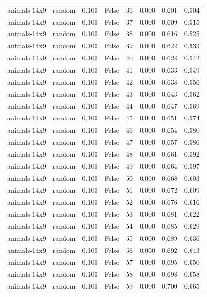 \begin{tabular}{llrrrrrr}
animals-14x9 & random & 0.100 & False & 36 & 0.000 & 0.601 & 0.504 \\
animals-14x9 & random & 0.100 & False & 37 & 0.000 & 0.609 & 0.515 \\
animals-14x9 & random & 0.100 & False & 38 & 0.000 & 0.616 & 0.525 \\
animals-14x9 & random & 0.100 & False & 39 & 0.000 & 0.622 & 0.533 \\
animals-14x9 & random & 0.100 & False & 40 & 0.000 & 0.628 & 0.542 \\
animals-14x9 & random & 0.100 & False & 41 & 0.000 & 0.633 & 0.549 \\
animals-14x9 & random & 0.100 & False & 42 & 0.000 & 0.638 & 0.556 \\
animals-14x9 & random & 0.100 & False & 43 & 0.000 & 0.643 & 0.562 \\
animals-14x9 & random & 0.100 & False & 44 & 0.000 & 0.647 & 0.569 \\
animals-14x9 & random & 0.100 & False & 45 & 0.000 & 0.651 & 0.574 \\
animals-14x9 & random & 0.100 & False & 46 & 0.000 & 0.654 & 0.580 \\
animals-14x9 & random & 0.100 & False & 47 & 0.000 & 0.657 & 0.586 \\
animals-14x9 & random & 0.100 & False & 48 & 0.000 & 0.661 & 0.592 \\
animals-14x9 & random & 0.100 & False & 49 & 0.000 & 0.664 & 0.597 \\
animals-14x9 & random & 0.100 & False & 50 & 0.000 & 0.668 & 0.603 \\
animals-14x9 & random & 0.100 & False & 51 & 0.000 & 0.672 & 0.609 \\
animals-14x9 & random & 0.100 & False & 52 & 0.000 & 0.676 & 0.616 \\
animals-14x9 & random & 0.100 & False & 53 & 0.000 & 0.681 & 0.622 \\
animals-14x9 & random & 0.100 & False & 54 & 0.000 & 0.685 & 0.629 \\
animals-14x9 & random & 0.100 & False & 55 & 0.000 & 0.689 & 0.636 \\
animals-14x9 & random & 0.100 & False & 56 & 0.000 & 0.692 & 0.643 \\
animals-14x9 & random & 0.100 & False & 57 & 0.000 & 0.695 & 0.650 \\
animals-14x9 & random & 0.100 & False & 58 & 0.000 & 0.698 & 0.658 \\
animals-14x9 & random & 0.100 & False & 59 & 0.000 & 0.700 & 0.665 \\

\end{tabular}
